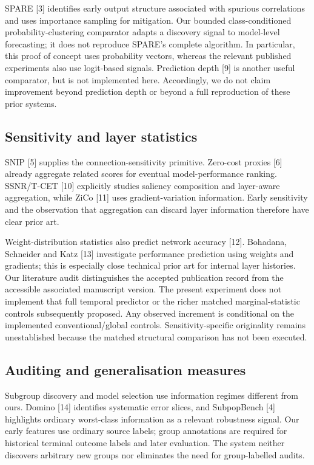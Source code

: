 SPARE [3] identifies early output structure associated with spurious correlations and uses importance sampling for mitigation. Our bounded class-conditioned probability-clustering comparator adapts a discovery signal to model-level forecasting; it does not reproduce SPARE's complete algorithm. In particular, this proof of concept uses probability vectors, whereas the relevant published experiments also use logit-based signals. Prediction depth [9] is another useful comparator, but is not implemented here. Accordingly, we do not claim improvement beyond prediction depth or beyond a full reproduction of these prior systems.

\subsection{Sensitivity and layer statistics}
SNIP [5] supplies the connection-sensitivity primitive. Zero-cost proxies [6] already aggregate related scores for eventual model-performance ranking. SSNR/T-CET [10] explicitly studies saliency composition and layer-aware aggregation, while ZiCo [11] uses gradient-variation information. Early sensitivity and the observation that aggregation can discard layer information therefore have clear prior art.

Weight-distribution statistics also predict network accuracy [12]. Bohadana, Schneider and Katz [13] investigate performance prediction using weights and gradients; this is especially close technical prior art for internal layer histories. Our literature audit distinguishes the accepted publication record from the accessible associated manuscript version. The present experiment does not implement that full temporal predictor or the richer matched marginal-statistic controls subsequently proposed. Any observed increment is conditional on the implemented conventional/global controls. Sensitivity-specific originality remains unestablished because the matched structural comparison has not been executed.

\subsection{Auditing and generalisation measures}
Subgroup discovery and model selection use information regimes different from ours. Domino [14] identifies systematic error slices, and SubpopBench [4] highlights ordinary worst-class information as a relevant robustness signal. Our early features use ordinary source labels; group annotations are required for historical terminal outcome labels and later evaluation. The system neither discovers arbitrary new groups nor eliminates the need for group-labelled audits.

